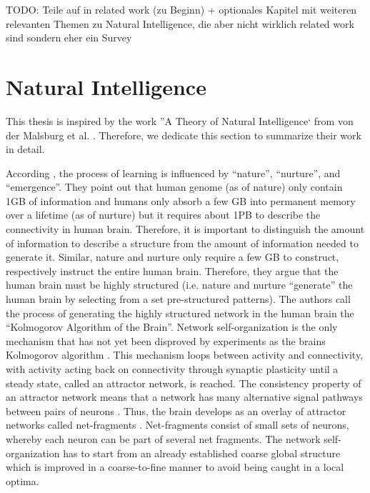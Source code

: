 
TODO: Teile auf in related work (zu Beginn) + optionales Kapitel mit weiteren relevanten Themen zu Natural Intelligence, die aber nicht wirklich related work sind sondern eher ein Survey

\section{Natural Intelligence}
This thesis is inspired by the work ''A Theory of Natural Intelligence` from von der Malsburg et al. .
Therefore, we dedicate this section to summarize their work in detail.

According \cite{von_der_Malsburg_Stadelmann_Grewe_2022}, the process of learning is influenced by ``nature'', ``nurture'', and ``emergence''.
They point out that human genome (as of nature) only contain 1GB of information  and humans only absorb a few GB into permanent memory over a lifetime (as of nurture) but it requires about 1PB to describe the connectivity in human brain.
Therefore, it is important to distinguish the amount of information to describe a structure from the amount of information needed to generate it.
Similar, nature and nurture only require a few GB to construct, respectively instruct the entire human brain.
Therefore, they argue that the human brain must be highly structured (i.e. nature and nurture ``generate'' the human brain by selecting from a set pre-structured patterns).
The authors call the process of generating the highly structured network in the human brain the ``Kolmogorov  Algorithm of the Brain''.
Network self-organization is the only mechanism that has not yet been disproved by experiments as the brains Kolmogorov algorithm .
This mechanism loops between activity and connectivity, with activity acting back on connectivity through synaptic plasticity until a steady state, called an attractor network, is reached.
The consistency property of an attractor network means that a network has many alternative signal pathways between pairs of neurons .
Thus, the brain develops as an overlay of attractor networks called net-fragments .
Net-fragments consist of small sets of neurons, whereby each neuron can be part of several net fragments.
The network self-organization has to start from an already established coarse global structure which is improved in a coarse-to-fine manner to avoid being caught in a local optima.

